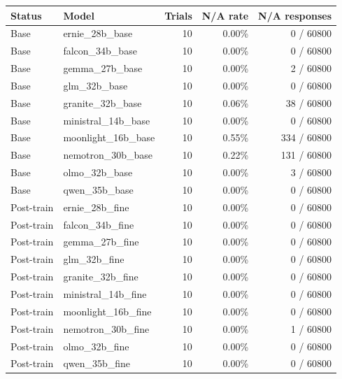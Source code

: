 \small
\begin{tabular}{llrrr}
\toprule
Status & Model & Trials & N/A rate & N/A responses \\
\midrule
Base & ernie\_28b\_base & 10 & 0.00\% & 0 / 60800 \\
Base & falcon\_34b\_base & 10 & 0.00\% & 0 / 60800 \\
Base & gemma\_27b\_base & 10 & 0.00\% & 2 / 60800 \\
Base & glm\_32b\_base & 10 & 0.00\% & 0 / 60800 \\
Base & granite\_32b\_base & 10 & 0.06\% & 38 / 60800 \\
Base & ministral\_14b\_base & 10 & 0.00\% & 0 / 60800 \\
Base & moonlight\_16b\_base & 10 & 0.55\% & 334 / 60800 \\
Base & nemotron\_30b\_base & 10 & 0.22\% & 131 / 60800 \\
Base & olmo\_32b\_base & 10 & 0.00\% & 3 / 60800 \\
Base & qwen\_35b\_base & 10 & 0.00\% & 0 / 60800 \\
\midrule
Post-train & ernie\_28b\_fine & 10 & 0.00\% & 0 / 60800 \\
Post-train & falcon\_34b\_fine & 10 & 0.00\% & 0 / 60800 \\
Post-train & gemma\_27b\_fine & 10 & 0.00\% & 0 / 60800 \\
Post-train & glm\_32b\_fine & 10 & 0.00\% & 0 / 60800 \\
Post-train & granite\_32b\_fine & 10 & 0.00\% & 0 / 60800 \\
Post-train & ministral\_14b\_fine & 10 & 0.00\% & 0 / 60800 \\
Post-train & moonlight\_16b\_fine & 10 & 0.00\% & 0 / 60800 \\
Post-train & nemotron\_30b\_fine & 10 & 0.00\% & 1 / 60800 \\
Post-train & olmo\_32b\_fine & 10 & 0.00\% & 0 / 60800 \\
Post-train & qwen\_35b\_fine & 10 & 0.00\% & 0 / 60800 \\
\hline
\end{tabular}
